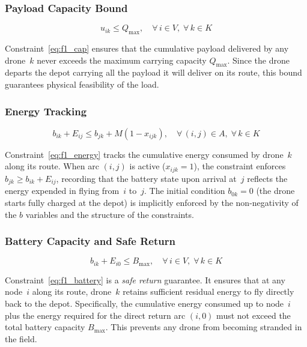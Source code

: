 \documentclass[11pt,a4paper]{article}
\begin{document}
\subsubsection{Payload Capacity Bound}
\begin{equation}
  u_{ik} \le Q_{\max}, \quad \forall\, i \in V,\; \forall\, k \in K
  \label{eq:f1_cap}
\end{equation}

Constraint~\eqref{eq:f1_cap} ensures that the cumulative payload delivered by any drone~$k$ never exceeds the maximum carrying capacity $Q_{\max}$. Since the drone departs the depot carrying all the payload it will deliver on its route, this bound guarantees physical feasibility of the load.

\subsubsection{Energy Tracking}
\begin{equation}
  b_{ik} + E_{ij} \le b_{jk} + M(1 - x_{ijk}), \quad \forall\, (i,j) \in A,\; \forall\, k \in K
  \label{eq:f1_energy}
\end{equation}

Constraint~\eqref{eq:f1_energy} tracks the cumulative energy consumed by drone~$k$ along its route. When arc $(i,j)$ is active ($x_{ijk} = 1$), the constraint enforces $b_{jk} \ge b_{ik} + E_{ij}$, recording that the battery state upon arrival at~$j$ reflects the energy expended in flying from~$i$ to~$j$. The initial condition $b_{0k} = 0$ (the drone starts fully charged at the depot) is implicitly enforced by the non-negativity of the $b$ variables and the structure of the constraints.

\subsubsection{Battery Capacity and Safe Return}
\begin{equation}
  b_{ik} + E_{i0} \le B_{\max}, \quad \forall\, i \in V,\; \forall\, k \in K
  \label{eq:f1_battery}
\end{equation}

Constraint~\eqref{eq:f1_battery} is a \emph{safe return} guarantee. It ensures that at any node~$i$ along its route, drone~$k$ retains sufficient residual energy to fly directly back to the depot. Specifically, the cumulative energy consumed up to node~$i$ plus the energy required for the direct return arc $(i, 0)$ must not exceed the total battery capacity $B_{\max}$. This prevents any drone from becoming stranded in the field.
\end{document}
